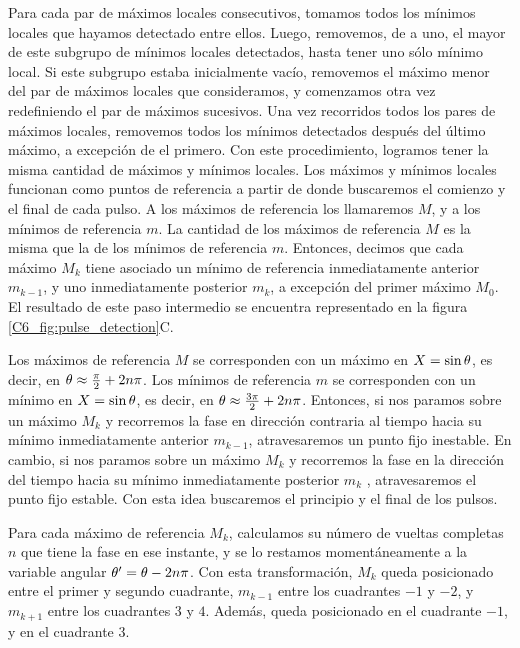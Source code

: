 \documentclass[./main.tex]{subfiles}
\begin{document}
Para cada par de máximos locales consecutivos, tomamos todos los mínimos locales que hayamos detectado entre ellos. Luego, removemos, de a uno, el mayor de este subgrupo de mínimos locales detectados, hasta tener uno sólo mínimo local. Si este subgrupo estaba inicialmente vacío, removemos el máximo menor del par de máximos locales que consideramos, y comenzamos otra vez redefiniendo el par de máximos sucesivos. Una vez recorridos todos los pares de máximos locales, removemos todos los mínimos detectados después del último máximo, a excepción de el primero. Con este procedimiento, logramos tener la misma cantidad de máximos y mínimos locales. Los máximos y mínimos locales funcionan como puntos de referencia a partir de donde buscaremos el comienzo y el final de cada pulso. A los máximos de referencia los llamaremos $M$, y a los mínimos de referencia $m$. La cantidad de los máximos de referencia $M$ es la misma que la de los mínimos de referencia $m$. Entonces, decimos que cada máximo $M_k$ tiene asociado un mínimo de referencia inmediatamente anterior $m_{k-1}$, y uno inmediatamente posterior $m_{k}$, a excepción del primer máximo $M_0$. El resultado de este paso intermedio se encuentra representado en la figura \ref{C6_fig:pulse_detection}C.


Los máximos de referencia $M$ se corresponden con un máximo en $X = \sin{\ensuremath{\theta}}$, es decir, en $\theta \approx \frac{\pi}{2} + 2n\pi$. Los mínimos de referencia $m$ se corresponden con un mínimo en $X = \sin{\ensuremath{\theta}}$, es decir, en $\theta \approx \frac{3\pi}{2} + 2n\pi$. Entonces, si nos paramos sobre un máximo $M_k$ y recorremos la fase en dirección contraria al tiempo hacia su mínimo inmediatamente anterior $m_{k-1}$, atravesaremos un punto fijo inestable. En cambio, si nos paramos sobre un máximo $M_k$ y recorremos la fase en la dirección del tiempo hacia su mínimo inmediatamente posterior $m_{k}$ , atravesaremos el punto fijo estable. Con esta idea buscaremos el principio y el final de los pulsos. 



Para cada máximo de referencia $M_k$, calculamos su número de vueltas completas $n$ que tiene la fase en ese instante, y se lo restamos momentáneamente a la variable angular $\theta' = \theta - 2n \pi$. Con esta transformación, $M_k$ queda posicionado entre el primer y segundo cuadrante, $m_{k-1}$ entre los cuadrantes $-1$ y $-2$, y $m_{k+1}$ entre los cuadrantes $3$ y $4$. Además, \xxe queda posicionado en el cuadrante $-1$, y \xxi en el cuadrante $3$. 
\end{document}
